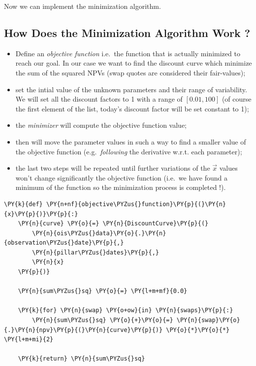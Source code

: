 Now we can implement the minimization algorithm.
            
\subsection{How Does the Minimization Algorithm Work ?}\label{how-does-the-minimization-algorithm-work}

\begin{itemize}
\item
  Define an \emph{objective function} i.e.~the function that is actually minimized to reach our goal. In our case we want to find the discount curve which minimize the sum of the squared NPVs (swap quotes are considered their fair-values);
\item
  set the intial value of the unknown parameters and their range of variability. We will set all the discount factors to 1 with a range of \([0.01, 100]\) (of course the first element of the list, today's discount factor will be set constant to 1);
\item
  the \emph{minimizer} will compute the objective function value;
\item
  then will move the parameter values in such a way to find a smaller value of the objective function (e.g.~\emph{following} the derivative w.r.t. each parameter);
\item
  the last two steps will be repeated until further variations of the $\vec{x}$ values won't change significantly the objective function (i.e.~we have found a minimum of the function so the minimization process is completed !).
\end{itemize}

\begin{Verbatim}[commandchars=\\\{\}]
\PY{k}{def} \PY{n+nf}{objective\PYZus{}function}\PY{p}{(}\PY{n}{x}\PY{p}{)}\PY{p}{:}             
    \PY{n}{curve} \PY{o}{=} \PY{n}{DiscountCurve}\PY{p}{(}       
        \PY{n}{ois\PYZus{}data}\PY{o}{.}\PY{n}{observation\PYZus{}date}\PY{p}{,}
        \PY{n}{pillar\PYZus{}dates}\PY{p}{,}
        \PY{n}{x}
    \PY{p}{)}
    
    \PY{n}{sum\PYZus{}sq} \PY{o}{=} \PY{l+m+mf}{0.0}
    
    \PY{k}{for} \PY{n}{swap} \PY{o+ow}{in} \PY{n}{swaps}\PY{p}{:}
        \PY{n}{sum\PYZus{}sq} \PY{o}{+}\PY{o}{=} \PY{n}{swap}\PY{o}{.}\PY{n}{npv}\PY{p}{(}\PY{n}{curve}\PY{p}{)} \PY{o}{*}\PY{o}{*} \PY{l+m+mi}{2}
        
    \PY{k}{return} \PY{n}{sum\PYZus{}sq}
\end{Verbatim}

